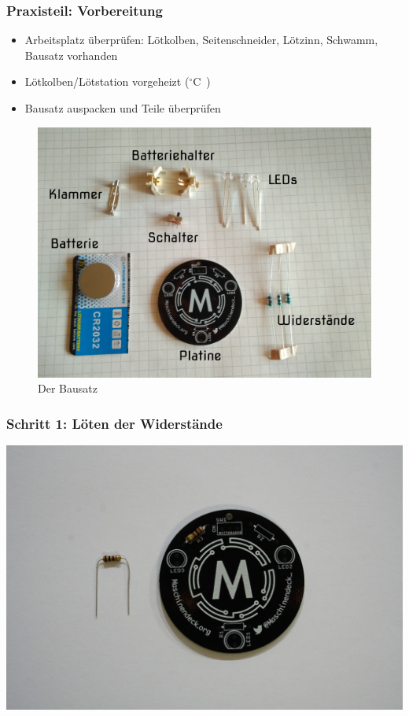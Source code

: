\documentclass[10pt]{beamer}
\begin{document}
	\begin{frame}
	\frametitle{Praxisteil: Vorbereitung}
	\begin{itemize}
		\item{Arbeitsplatz überprüfen: Lötkolben, Seitenschneider, Lötzinn, Schwamm, Bausatz vorhanden}
		\item{Lötkolben/Lötstation vorgeheizt (\unit[350]{$^\circ$C})}
		\item{Bausatz auspacken und Teile überprüfen}
	\end{itemize}
	\begin{figure}[hbtp]
		\centering
		\includegraphics[width=\linewidth*5/10]{images/badge.jpg}
		\caption{Der Bausatz}
	\end{figure}
	\end{frame}

	\begin{frame}
		\frametitle{Schritt 1: Löten der Widerstände}
		\includegraphics[width=\linewidth]{images/badge18/resistor.JPG}
	\end{frame}
	
\end{document}
